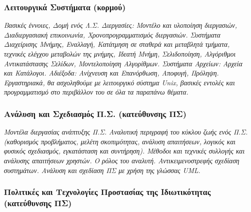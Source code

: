 \hypertarget{ux3bbux3b5ux3b9ux3c4ux3bfux3c5ux3c1ux3b3ux3b9ux3baux3ac-ux3c3ux3c5ux3c3ux3c4ux3aeux3bcux3b1ux3c4ux3b1-ux3baux3bfux3c1ux3bcux3bfux3cd-1}{%
\subsubsection{Λειτουργικά Συστήματα
(κορμού)}\label{ux3bbux3b5ux3b9ux3c4ux3bfux3c5ux3c1ux3b3ux3b9ux3baux3ac-ux3c3ux3c5ux3c3ux3c4ux3aeux3bcux3b1ux3c4ux3b1-ux3baux3bfux3c1ux3bcux3bfux3cd-1}}

\emph{Βασικές έννοιες, Δομή ενός Λ.Σ. Διεργασίες: Μοντέλο και υλοποίηση
διεργασιών, Διαδιεργασιακή επικοινωνία, Χρονοπρογραμματισμός διεργασιών.
Συστήματα Διαχείρισης Μνήμης, Εναλλαγή, Κατάτμηση σε σταθερά και
μεταβλητά τμήματα, τεχνικές ελέγχου μεταβολών της μνήμης, Ιδεατή Μνήμη,
Σελιδοποίηση, Αλγόριθμοι Αντικατάστασης Σελίδων, Μοντελοποίηση
Αλγορίθμων. Συστήματα Αρχείων: Αρχεία και Κατάλογοι. Αδιέξοδα: Ανίχνευση
και Επανόρθωση, Αποφυγή, Πρόληψη. Εργαστηριακά, θα ασχοληθούμε με
λειτουργικό σύστημα Unix, βασικές εντολές και προγραμματισμό στο
περιβάλλον του σε όλα τα παραπάνω θέματα.}

\hypertarget{ux3b1ux3bdux3acux3bbux3c5ux3c3ux3b7-ux3baux3b1ux3b9-ux3c3ux3c7ux3b5ux3b4ux3b9ux3b1ux3c3ux3bcux3ccux3c2-ux3c0.ux3c3.-ux3baux3b1ux3c4ux3b5ux3cdux3b8ux3c5ux3bdux3c3ux3b7ux3c2-ux3c0ux3c3}{%
\subsubsection{Ανάλυση και Σχεδιασμός Π.Σ. (κατεύθυνσης
ΠΣ)}\label{ux3b1ux3bdux3acux3bbux3c5ux3c3ux3b7-ux3baux3b1ux3b9-ux3c3ux3c7ux3b5ux3b4ux3b9ux3b1ux3c3ux3bcux3ccux3c2-ux3c0.ux3c3.-ux3baux3b1ux3c4ux3b5ux3cdux3b8ux3c5ux3bdux3c3ux3b7ux3c2-ux3c0ux3c3}}

\emph{Μοντέλα διεργασίας ανάπτυξης Π.Σ. Αναλυτική περιγραφή του κύκλου
ζωής ενός Π.Σ. (καθορισμός προβλήματος, μελέτη σκοπιμότητας, ανάλυση
απαιτήσεων, λογικός και φυσικός σχεδιασμός, εγκατάσταση και συντήρηση).
Μέθοδοι και τεχνικές συλλογής και ανάλυσης απαιτήσεων χρηστών. Ο ρόλος
του αναλυτή. Αντικειμενοστρεφής σχεδίαση συστημάτων. Ανάλυση και
σχεδίαση ΠΣ με χρήση της γλώσσας UML.}

\hypertarget{ux3c0ux3bfux3bbux3b9ux3c4ux3b9ux3baux3adux3c2-ux3baux3b1ux3b9-ux3c4ux3b5ux3c7ux3bdux3bfux3bbux3bfux3b3ux3afux3b5ux3c2-ux3c0ux3c1ux3bfux3c3ux3c4ux3b1ux3c3ux3afux3b1ux3c2-ux3c4ux3b7ux3c2-ux3b9ux3b4ux3b9ux3c9ux3c4ux3b9ux3baux3ccux3c4ux3b7ux3c4ux3b1ux3c2-ux3baux3b1ux3c4ux3b5ux3cdux3b8ux3c5ux3bdux3c3ux3b7ux3c2-ux3c0ux3c3}{%
\subsubsection{Πολιτικές και Τεχνολογίες Προστασίας της Ιδιωτικότητας
(κατεύθυνσης
ΠΣ)}\label{ux3c0ux3bfux3bbux3b9ux3c4ux3b9ux3baux3adux3c2-ux3baux3b1ux3b9-ux3c4ux3b5ux3c7ux3bdux3bfux3bbux3bfux3b3ux3afux3b5ux3c2-ux3c0ux3c1ux3bfux3c3ux3c4ux3b1ux3c3ux3afux3b1ux3c2-ux3c4ux3b7ux3c2-ux3b9ux3b4ux3b9ux3c9ux3c4ux3b9ux3baux3ccux3c4ux3b7ux3c4ux3b1ux3c2-ux3baux3b1ux3c4ux3b5ux3cdux3b8ux3c5ux3bdux3c3ux3b7ux3c2-ux3c0ux3c3}}

